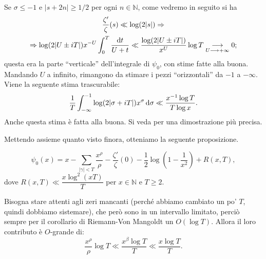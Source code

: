 \begin{oss}
  Se $\sigma \le -1$ e $|s+2n| \ge 1/2$ per ogni $n \in \mathbb{N}$, come vedremo in seguito si ha
  \begin{gather*}
    \frac{\zeta'}{\zeta}(s) \ll \log(2|s|) \Rightarrow \\
    \Rightarrow \log(2|U\pm iT|)x^{-U}\int_0^T \frac{\mathop{}\!\mathrm{d} t}{U+t} \ll \frac{\log(2|U\pm iT|)}{x^U}\log{T} \underset{U \longrightarrow +\infty}{\longrightarrow} 0;
  \end{gather*}
  questa era la parte ``verticale'' dell'integrale di $\psi_0$, con stime fatte alla buona. Mandando $U$ a infinito, rimangono da stimare i pezzi ``orizzontali'' da $-1$ a $-\infty$. Viene la seguente stima trascurabile:
  $$\frac{1}{T}\int_{-\infty}^{-1} \log(2|\sigma+iT|)x^{\sigma}\mathop{}\!\mathrm{d} \sigma \ll \frac{x^{-1}\log{T}}{T\log{x}}.$$
  Anche questa stima è fatta alla buona. Si veda \cite{D} per una dimostrazione più precisa.
\end{oss}

Mettendo assieme quanto visto finora, otteniamo la seguente proposizione.

\begin{prop}
  \begin{equation*}
    \psi_0(x)=x-\sum_{|\gamma| < T} \frac{x^{\rho}}{\rho}-\frac{\zeta'}{\zeta}(0)-\frac{1}{2}\log\left(1-\frac{1}{x^2}\right)+R(x,T),
  \end{equation*}
  dove $R(x,T) \ll \dfrac{x\log^2(xT)}{T}$ per $x \in \mathbb{N}$ e $T \ge 2$.
\end{prop}

Bisogna stare attenti agli zeri mancanti (perché abbiamo cambiato un po' $T$, quindi dobbiamo sistemare), che però sono in un intervallo limitato, perciò sempre per il corollario di Riemann-Von Mangoldt un $O(\log{T})$. Allora il loro contributo è $O$-grande di:
$$\frac{x^{\rho}}{\rho}\log{T} \ll \frac{x^{\beta}\log{T}}{T} \ll \frac{x\log{T}}{T}.$$
